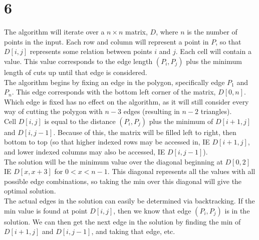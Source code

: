 \documentclass[letterpaper,notitlepage,twoside]{article}
\begin{document}
\section*{6}
The algorithm will iterate over a $n\times n$ matrix, $D$, where $n$ is the number of points in the input. Each row and column will represent a point in $P$, so that $D[i, j]$ represents some relation between points $i$ and $j$. Each cell will contain a value. This value corresponds to the edge length $(P_i, P_j)$ plus the minimum length of cuts up until that edge is considered. \\
The algorithm begins by fixing an edge in the polygon, specifically edge $P_1$ and $P_n$. This edge corresponds with the bottom left corner of the matrix, $D[0, n]$. Which edge is fixed has no effect on the algorithm, as it will still consider every way of cutting the polygon with $n-3$ edges (resulting in $n-2$ triangles). \\
Cell $D[i, j]$ is equal to the distance $(P_i, P_j)$ plus the minimum of $D[i+1, j]$ and $D[i, j-1]$. Because of this, the matrix will be filled left to right, then bottom to top (so that higher indexed rows may be accessed in, IE $D[i+1, j]$, and lower indexed columns may also be accessed, IE $D[i, j-1]$). \\
The solution will be the minimum value over the diagonal beginning at $D[0,2]$ IE $D[x, x+3]$ for $0<x<n-1$. This diagonal represents all the values with all possible edge combinations, so taking the min over this diagonal will give the optimal solution. \\
The actual edges in the solution can easily be determined via backtracking. If the min value is found at point $D[i, j]$, then we know that edge $(P_i, P_j)$ is in the solution. We can then get the next edge in the solution by finding the min of $D[i+1, j]$ and $D[i, j-1]$, and taking that edge, etc. \\
\end{document}
